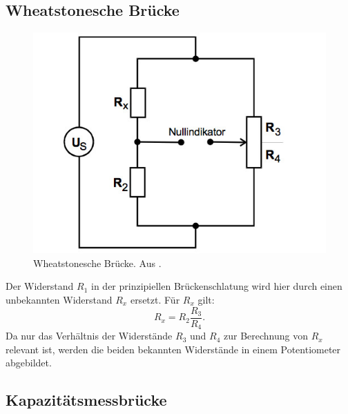 \subsection{Wheatstonesche Brücke}
\begin{figure}
  \centering
  \includegraphics[scale=0.5]{content/wheatstone.jpg}
  \caption{Wheatstonesche Brücke. Aus \cite{anleitung302}.}
  \label{fig:wheatstone}
\end{figure}

Der Widerstand $R_{1}$ in der prinzipiellen Brückenschlatung wird hier durch einen unbekannten Widerstand $R_x$ ersetzt. Für $R_x$ gilt:
\begin{equation}
\label{eqn:wheatstone}
  R_x = R_{2} \frac{R_3}{R_4}.
\end{equation}
Da nur das Verhältnis der Widerstände $R_3$ und $R_4$ zur Berechnung von $R_x$ relevant ist, werden die beiden bekannten Widerstände in einem Potentiometer abgebildet.

\subsection{Kapazitätsmessbrücke}

